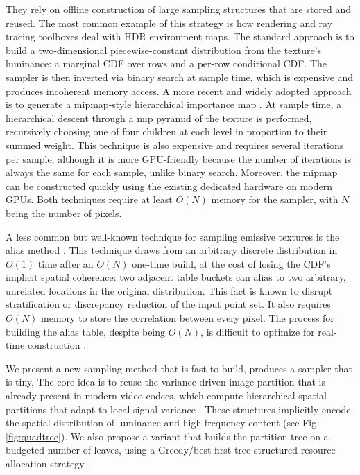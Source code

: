 \documentclass[acmtog,review]{acmart}
\begin{document}
 They rely on offline construction of large sampling structures that are stored and reused. The most common example of this strategy is how rendering and ray tracing toolboxes deal with HDR environment maps. The standard approach is to build a two-dimensional piecewise-constant distribution from the texture's luminance: a marginal CDF over rows and a per-row conditional CDF. The sampler is then inverted via binary search at sample time, which is expensive and produces incoherent memory access. A more recent and widely adopted approach is to generate a mipmap-style hierarchical importance map \cite{clarberg2005wavelet}. At sample time, a hierarchical descent through a mip pyramid
of the texture is performed, recursively choosing one of four children at each level in proportion to their summed weight. This technique is also expensive and requires several iterations per sample, although it is more GPU-friendly because the number of iterations is always the same for each sample, unlike binary search. Moreover, the mipmap can be constructed quickly using the existing dedicated hardware on modern GPUs. Both techniques require at least $O(N)$ memory for the sampler, with $N$ being the number of pixels.

A less common but well-known technique for sampling emissive textures is the alias method \cite{burke2004bidirectional}. This technique draws from an arbitrary discrete distribution in $O(1)$ time after an $O(N)$ one-time build, at the cost of losing the CDF's implicit spatial coherence: two adjacent table buckets can alias to two arbitrary, unrelated locations in the original distribution. This fact is known to disrupt stratification or discrepancy reduction of the input point set. It also requires $O(N)$ memory to store the correlation between every pixel. The process for building the alias table, despite being $O(N)$, is difficult to optimize for real-time construction \cite{lehmann2021weighted}.

We present a new sampling method that is fast to build, produces a sampler that is tiny,  The core idea is to reuse the variance-driven image partition that is already present in modern video codecs, which compute hierarchical spatial partitions that adapt to local signal variance \cite{uhrina2024performance}. These structures implicitly encode the spatial distribution
of luminance and high-frequency content (see Fig. \ref{fig:quadtree}). We also propose a variant that builds the partition tree on a budgeted number of leaves, using a  Greedy/best-first tree-structured resource allocation strategy \cite{MINASNY2007383,Zhou2024}. 
\end{document}
